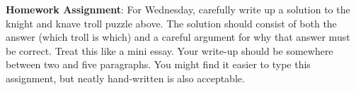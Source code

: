 \documentclass[11pt]{exam}
\begin{document}
\vfill

{\bf Homework Assignment}: For Wednesday, carefully write up a solution to the knight and knave troll puzzle above.  The solution should consist of both the answer (which troll is which) and a careful argument for why that answer must be correct.  Treat this like a mini essay.  Your write-up should be somewhere between two and five paragraphs.  You might find it easier to type this assignment, but neatly hand-written is also acceptable.
\end{document}
